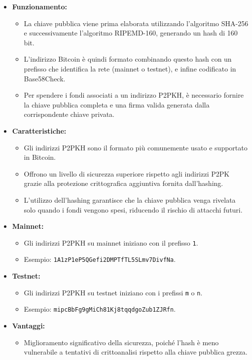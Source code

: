 \documentclass{article}
\begin{document}
\begin{itemize}
    \item \textbf{Funzionamento:}
    \begin{itemize}
        \item La chiave pubblica viene prima elaborata utilizzando l'algoritmo SHA-256 e successivamente l'algoritmo RIPEMD-160, generando un hash di 160 bit.
        \item L'indirizzo Bitcoin è quindi formato combinando questo hash con un prefisso che identifica la rete (mainnet o testnet), e infine codificato in Base58Check.
        \item Per spendere i fondi associati a un indirizzo P2PKH, è necessario fornire la chiave pubblica completa e una firma valida generata dalla corrispondente chiave privata.
    \end{itemize}
    \item \textbf{Caratteristiche:}
    \begin{itemize}
        \item Gli indirizzi P2PKH sono il formato più comunemente usato e supportato in Bitcoin.
        \item Offrono un livello di sicurezza superiore rispetto agli indirizzi P2PK grazie alla protezione crittografica aggiuntiva fornita dall'hashing.
        \item L'utilizzo dell'hashing garantisce che la chiave pubblica venga rivelata solo quando i fondi vengono spesi, riducendo il rischio di attacchi futuri.
    \end{itemize}
    \item \textbf{Mainnet:}
    \begin{itemize}
        \item Gli indirizzi P2PKH su mainnet iniziano con il prefisso \texttt{1}.
        \item Esempio: \texttt{1A1zP1eP5QGefi2DMPTfTL5SLmv7DivfNa}.
    \end{itemize}
    \item \textbf{Testnet:}
    \begin{itemize}
        \item Gli indirizzi P2PKH su testnet iniziano con i prefissi \texttt{m} o \texttt{n}.
        \item Esempio: \texttt{mipcBbFg9gMiCh81Kj8tqqdgoZub1ZJRfn}.
    \end{itemize}
    \item \textbf{Vantaggi:}
    \begin{itemize}
        \item Miglioramento significativo della sicurezza, poiché l'hash è meno vulnerabile a tentativi di crittoanalisi rispetto alla chiave pubblica grezza.

\end{itemize}
\end{itemize}
\end{document}
